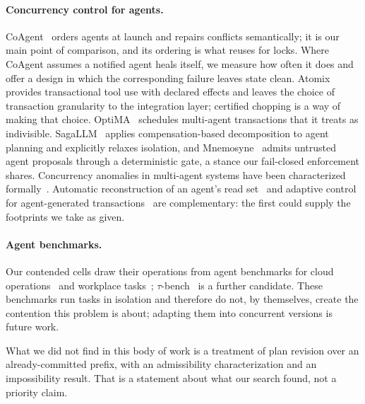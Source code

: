 \paragraph{Concurrency control for agents.}
CoAgent~\cite{lyu2026coagent} orders agents at launch and repairs conflicts
semantically; it is our main point of comparison, and its ordering is what
\ccs reuses for locks. Where CoAgent assumes a notified agent heals itself,
we measure how often it does and offer a design in which the corresponding
failure leaves state clean. Atomix~\cite{mohammadi2026atomix} provides
transactional tool use with declared effects and leaves the choice of
transaction granularity to the integration layer; certified chopping is a way
of making that choice. OptiMA~\cite{calikyilmaz2025optima} schedules
multi-agent transactions that it treats as indivisible.
SagaLLM~\cite{chang2025sagallm} applies compensation-based decomposition to
agent planning and explicitly relaxes isolation, and
Mnemosyne~\cite{chang2026mnemosyne} admits untrusted agent proposals through
a deterministic gate, a stance our fail-closed enforcement shares.
Concurrency anomalies in multi-agent systems have been characterized
formally~\cite{khan2026verified}. Automatic reconstruction of an agent's read
set~\cite{khan2026sbus} and adaptive control for agent-generated
transactions~\cite{zhou2026atcc} are complementary: the first could supply
the footprints we take as given.

\paragraph{Agent benchmarks.}
Our contended cells draw their operations from agent benchmarks for cloud
operations~\cite{chen2025aiopslab} and workplace
tasks~\cite{styles2024workbench}; $\tau$-bench~\cite{yao2024taubench} is a
further candidate. These benchmarks run tasks in isolation and therefore do
not, by themselves, create the contention this problem is about; adapting
them into concurrent versions is future work.

What we did not find in this body of work is a treatment of plan revision
over an already-committed prefix, with an admissibility characterization and
an impossibility result. That is a statement about what our search found, not
a priority claim.
